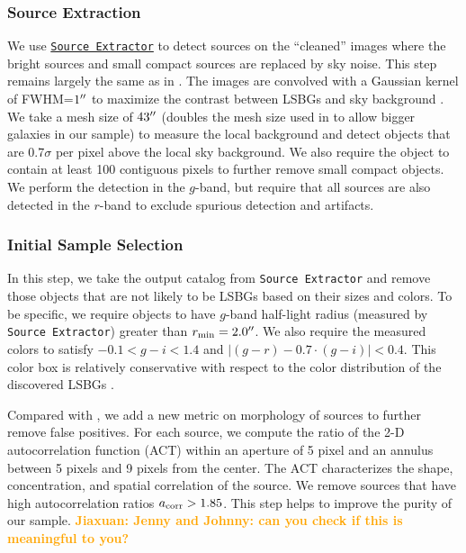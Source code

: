 \documentclass[twocolumn,astrosymb,twocolappendix]{aastex631}
\newcommand{\jiaxuan}[1]{\textcolor{orange}{\textbf{Jiaxuan: #1}}}
\newcommand{\code}[1]{\texttt{#1}}
\begin{document}
\begin{CJK*}{UTF8}{gbsn}
\subsubsection{Source Extraction}
We use \href{https://www.astromatic.net/software/sextractor/}{\code{Source Extractor}} \citep{Bertin1996} to detect sources on the ``cleaned'' images where the bright sources and small compact sources are replaced by sky noise. This step remains largely the same as in . The images are convolved with a Gaussian kernel of FWHM=$1\mbox{$^{\prime\prime}$}$ to maximize the contrast between LSBGs and sky background \citep[e.g.,][]{Irwin1985,Akhlaghi2015,Greco2018}. We take a mesh size of $43\mbox{$^{\prime\prime}$}$ (doubles the mesh size used in  to allow bigger galaxies in our sample) to measure the local background and detect objects that are 0.7$\sigma$ per pixel above the local sky background. We also require the object to contain at least 100 contiguous pixels to further remove small compact objects. We perform the detection in the $g$-band, but require that all sources are also detected in the $r$-band to exclude spurious detection and artifacts.
    
\subsubsection{Initial Sample Selection} 
In this step, we take the output catalog from \code{Source Extractor} and remove those objects that are not likely to be LSBGs based on their sizes and colors. To be specific, we require objects to have $g$-band half-light radius (measured by \code{Source Extractor}) greater than $r_{\rm min} = 2.0\mbox{$^{\prime\prime}$}$. We also require the measured colors to satisfy $-0.1 < g-i < 1.4$ and $|(g-r) - 0.7\cdot (g-i)| < 0.4$. This color box is relatively conservative with respect to the color distribution of the discovered LSBGs \citep[e.g.,][]{Greco2018,Zaritsky2019,Tanoglidis2021,SAGA-I}. 

Compared with , we add a new metric on morphology of sources to further remove false positives. For each source, we compute the ratio of the 2-D autocorrelation function (ACT) within an aperture of 5 pixel and an annulus between 5 pixels and 9 pixels from the center. The ACT characterizes the shape, concentration, and spatial correlation of the source. We remove sources that have high autocorrelation ratios $a_{\rm corr} > 1.85$. This step helps to improve the purity of our sample. \jiaxuan{Jenny and Johnny: can you check if this is meaningful to you?} 


\end{CJK*}
\end{document}
